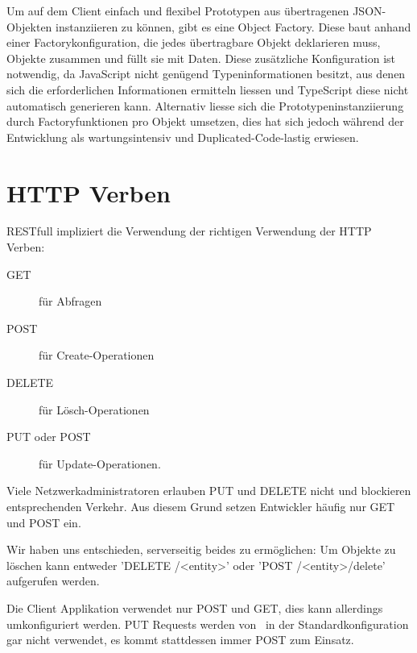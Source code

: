 		Um auf dem Client einfach und flexibel Prototypen aus übertragenen JSON-Objekten instanziieren zu können, gibt es eine Object Factory.
		Diese baut anhand einer Factorykonfiguration, die jedes übertragbare Objekt deklarieren muss, Objekte zusammen und füllt sie mit Daten.
		Diese zusätzliche Konfiguration ist notwendig, da JavaScript nicht genügend Typeninformationen besitzt, aus denen sich die erforderlichen Informationen ermitteln liessen und TypeScript diese nicht automatisch generieren kann.
		Alternativ liesse sich die Prototypeninstanziierung  durch Factoryfunktionen pro Objekt umsetzen, dies hat sich jedoch während der Entwicklung als wartungsintensiv und Duplicated-Code-lastig erwiesen.
		
		
\section{HTTP Verben}
		RESTfull impliziert die Verwendung der richtigen Verwendung der HTTP Verben: 
		\begin{description}
			\item[GET] für Abfragen
			\item[POST] für Create-Operationen
			\item[DELETE] für Lösch-Operationen
			\item[PUT oder POST] für Update-Operationen.
		\end{description}
		
		Viele Netzwerkadministratoren erlauben PUT und DELETE nicht und blockieren entsprechenden Verkehr. Aus diesem Grund setzen Entwickler häufig nur GET und POST ein.
		
		Wir haben uns entschieden, serverseitig beides zu ermöglichen:
		Um Objekte zu löschen kann entweder 'DELETE /<entity>' oder 'POST /<entity>/delete' aufgerufen werden.
		
		Die Client Applikation verwendet nur POST und GET, dies kann allerdings umkonfiguriert werden.
		PUT Requests werden von \eeppi\ in der Standardkonfiguration gar nicht verwendet,
		es kommt stattdessen immer POST zum Einsatz.
